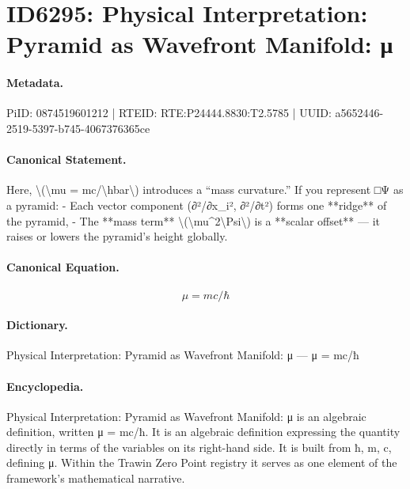 \section*{ID6295: Physical Interpretation: Pyramid as Wavefront Manifold: μ}
\paragraph{Metadata.}
PiID: 0874519601212 | RTEID: RTE:P24444.8830:T2.5785 | UUID: a5652446-2519-5397-b745-4067376365ce

\paragraph{Canonical Statement.}
Here, \textbackslash{}(\textbackslash{}mu = mc/\textbackslash{}hbar\textbackslash{}) introduces a “mass curvature.” If you represent □Ψ as a pyramid: - Each vector component (∂²/∂x\_i², ∂²/∂t²) forms one **ridge** of the pyramid, - The **mass term** \textbackslash{}(\textbackslash{}mu\textasciicircum{}2\textbackslash{}Psi\textbackslash{}) is a **scalar offset** — it raises or lowers the pyramid’s height globally.

\paragraph{Canonical Equation.}
\[
\mu = mc/\hbar
\]

\paragraph{Dictionary.}
Physical Interpretation: Pyramid as Wavefront Manifold: μ — μ = mc/ħ

\paragraph{Encyclopedia.}
Physical Interpretation: Pyramid as Wavefront Manifold: μ is an algebraic definition, written μ = mc/ħ. It is an algebraic definition expressing the quantity directly in terms of the variables on its right-hand side. It is built from ħ, m, c, defining μ. Within the Trawin Zero Point registry it serves as one element of the framework's mathematical narrative.
